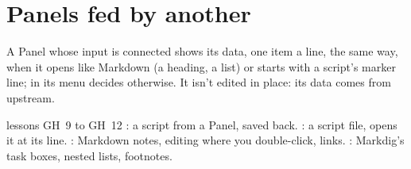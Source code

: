 \section{Panels fed by another}\label{sec:fedpanels}

A Panel whose input is connected shows its data, one item a line, the same way, when it opens like Markdown (a
heading, a list) or starts with a script's marker line;  in its menu decides otherwise. It isn't edited
in place: its data comes from upstream.

\begin{lesson}{lessons GH~9 to GH~12}
: a script from a Panel, saved back. : a script
file,  opens it at its line. : Markdown notes, editing where you
double-click, links. : Markdig's task boxes, nested lists, footnotes.
\end{lesson}
